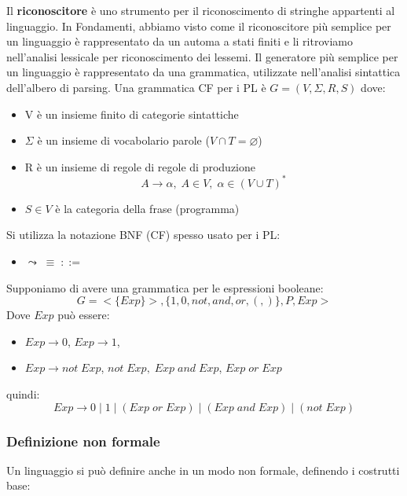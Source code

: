\documentclass[a4paper]{article}
\begin{document}
{
    Il \textbf{riconoscitore} è uno strumento per il riconoscimento di stringhe appartenti 
    al linguaggio. 
}
\noindent
In Fondamenti, abbiamo visto come il riconoscitore più semplice
per un linguaggio è rappresentato da un automa a stati finiti e li ritroviamo
nell'analisi lessicale per riconoscimento dei lessemi.
\noindent
Il generatore più semplice per un linguaggio è rappresentato da una grammatica, utilizzate
nell'analisi sintattica dell'albero di parsing.
Una grammatica CF per i PL è $G = (V, \Sigma, R, S)$ dove:
\begin{itemize}
    \item V è un insieme finito di categorie sintattiche
    \item $\Sigma$ è un insieme di vocabolario parole ($V \cap T = \varnothing$)
    \item R è un insieme di regole di regole di produzione 
    \[
        A   \to \alpha, \; A \in V, \; \alpha \in (V \cup T)^*
    \]
    \item $S \in V$ è la categoria della frase (programma)
\end{itemize}
Si utilizza la notazione BNF (CF) spesso usato per i PL:
\begin{itemize}
    \item $\leadsto \; \equiv \; ::=$ 
\end{itemize}
\ex{}
{
    Supponiamo di avere una grammatica per le espressioni booleane: 
    \[
        G = <\{Exp\}>, \{1, 0, not, and, or, (, )\}, P, Exp>
    \]
    Dove $Exp$ può essere:
    \begin{itemize}
        \item $Exp \to 0$, $Exp \to 1$,
        \item $Exp \to not \; Exp$, $not \; Exp, \; Exp \; and \; Exp$, $Exp \; or \; Exp$
    \end{itemize}
    quindi:
    \[
        Exp \to 0 \; | \; 1 \; | \; (Exp \; or\;  Exp)\;  |\;  (Exp \; and\;  Exp) \; | \; (not\; Exp)
    \]
}

\subsubsection{Definizione non formale}

Un linguaggio si può definire anche in un modo non formale,
definendo i costrutti base:
\end{document}
